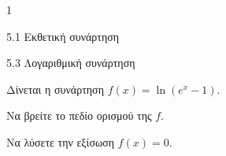 \begin{ylh}{1}
\item 5.1 Εκθετική συνάρτηση
\item 5.3 Λογαριθμική συνάρτηση
\end{ylh}
Δίνεται η συνάρτηση $f(x) = \ln(e^x - 1)$.
\begin{alist}
\item Να βρείτε το πεδίο ορισμού της $f$.
\item Να λύσετε την εξίσωση $f(x) = 0$.
\end{alist}

